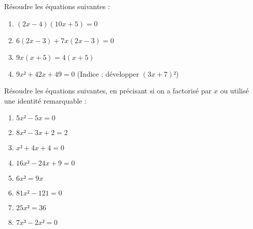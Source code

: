 \documentclass{beamer}
\begin{document}
\begin{frame}
	Résoudre les équations suivantes :
	\begin{enumerate}\setlength{\itemsep}{0.8em}
		\item $(2x - 4)(10x + 5) = 0$
		\item $6(2x - 3) + 7x(2x - 3) = 0$
		\item $9x(x + 5) = 4(x + 5)$
		\item $9x² + 42x + 49 = 0$ (Indice : développer $(3x + 7)²$)
	\end{enumerate}
\end{frame}

\begin{frame}
	Résoudre les équations suivantes, en précisant si on a factorisé par $x$ ou utilisé une identité remarquable :
	\begin{enumerate}
		\setlength{\itemsep}{0.8em}
		\item $5x² - 5x = 0$ 
		\item $8x² - 3x + 2 = 2$ 
		\item $x² + 4x + 4 = 0$ 
		\item $16x² - 24x + 9 = 0$ 
		\item $6x² = 9x$ 
		\item $81x² - 121 = 0$ 
		\item $25x² = 36$ 
		\item $7x³ - 2x² = 0$ 
	\end{enumerate}
\end{frame}
\end{document}
